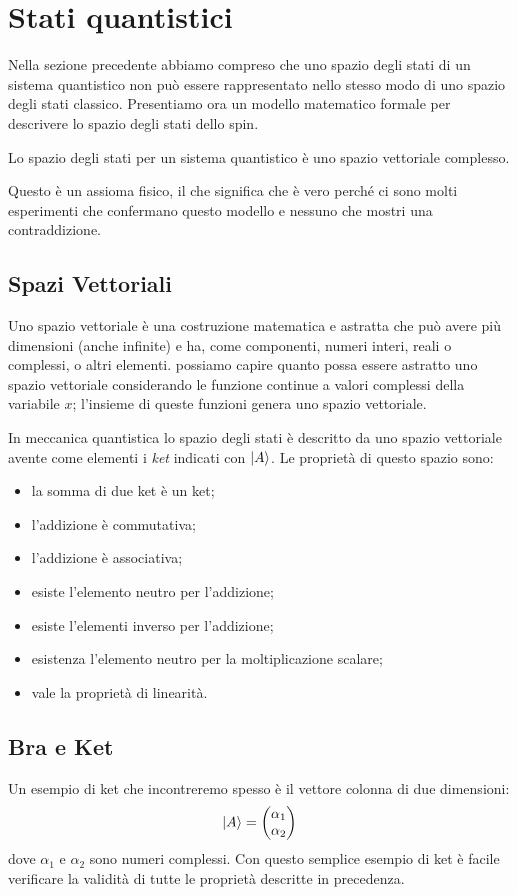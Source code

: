 \section{Stati quantistici}
Nella sezione precedente abbiamo compreso che uno spazio degli stati di un sistema quantistico non può essere rappresentato nello stesso modo di uno spazio degli stati classico. Presentiamo ora un modello matematico formale per descrivere lo spazio degli stati dello spin.

\begin{axiom} 
	Lo spazio degli stati per un sistema quantistico è uno spazio vettoriale complesso.
\end{axiom}

Questo è un assioma fisico, il che significa che è vero perché ci sono molti esperimenti che confermano questo modello e nessuno che mostri una contraddizione.

\subsection{Spazi Vettoriali}
Uno spazio vettoriale è una costruzione matematica e astratta che può avere più dimensioni (anche infinite) e ha, come componenti, numeri interi, reali o complessi, o altri elementi. possiamo capire quanto possa essere astratto uno spazio vettoriale considerando le funzione continue a valori complessi della variabile $x$; l'insieme di queste funzioni genera uno spazio vettoriale.

In meccanica quantistica lo spazio degli stati è descritto da uno spazio vettoriale avente come elementi  i \emph{ket} indicati con $\Ket{A}$. Le proprietà di questo spazio sono:

\begin{itemize}
	\item la somma di due ket è un ket;
	\item l'addizione è commutativa;
	\item l'addizione è associativa;
	\item esiste l'elemento neutro per l'addizione;
	\item esiste l'elementi inverso per l'addizione;
	\item esistenza l'elemento neutro per la moltiplicazione scalare;
	\item vale la proprietà di linearità.
\end{itemize}

\subsection{Bra e Ket}
Un esempio di ket che incontreremo spesso è il vettore colonna di due dimensioni:
\[
\Ket{A} = 
\begin{pmatrix}
	\alpha_1 \\
	\alpha_2
\end{pmatrix}
\]
dove $\alpha_1$ e $\alpha_2$ sono numeri complessi. Con questo semplice esempio di ket è facile verificare la validità di tutte le proprietà descritte in precedenza.


